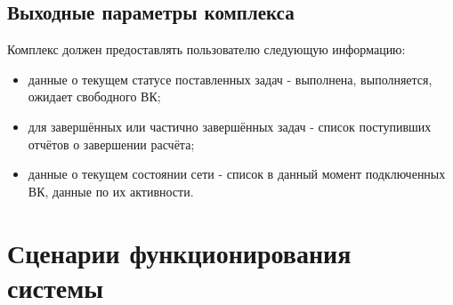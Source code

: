 \documentclass[a4paper,12pt]{report}
\numberwithin{equation}{section}
\begin{document}
\subsection{Выходные параметры комплекса}
Комплекс должен предоставлять пользователю следующую информацию:
\begin{itemize}
  \item данные о текущем статусе поставленных задач - выполнена, выполняется, ожидает свободного ВК;
  \item для завершённых или частично завершённых задач - список поступивших отчётов о завершении расчёта;
  \item данные о текущем состоянии сети - список в данный момент подключенных ВК, данные по их активности.
\end{itemize}

\section{Сценарии функционирования системы}
\end{document}
